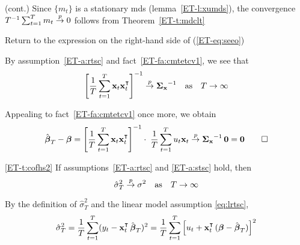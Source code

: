 \begin{frame}

    \vspace{2em}
    \Prf (cont.) Since
    $\{m_t\}$ is a stationary {\sc mds} (lemma~\ref{ET-l:xumds}), the convergence $T^{-1} \sum_{t=1}^T m_t
    \stackrel { p } {\to} 0$ follows from Theorem~\ref{ET-t:mdclt}
    
    Return to the expression on the right-hand side of
    (\ref{ET-eq:seeo})
    
    By assumption~\ref{ET-a:rtsc} and fact~\ref{ET-fa:cmtetcv1}, we see that
    \begin{equation}
        \label{eq:cttii}
        \left[ \frac{1}{T} \sum_{t=1}^T \boldx_t \boldx_t^\T \right]^{-1} \toprob \Sigmax^{-1}
        \quad \text{as} \quad
        T \to \infty
    \end{equation}
    
    Appealing to fact~\ref{ET-fa:cmtetcv1} once more, we obtain
    \begin{equation*}
        \hboldbeta_T - \boldbeta 
        = \left[ \frac{1}{T} \sum_{t=1}^T \boldx_t \boldx_t^\T \right]^{-1} 
            \cdot \; \frac{1}{T} \sum_{t=1}^T u_t \boldx_t 
            \toprob \Sigmax^{-1} \, \boldzero = \boldzero
        \qedhere
    \end{equation*}
    
\end{frame}

\begin{frame}

    \vspace{2em}
    \Thm
    \eqref{ET-t:cofhs2}
    If assumptions~\ref{ET-a:rtsc} and \ref{ET-a:stsc} hold, then 
    \begin{equation*}
        \hat \sigma^2_T \stackrel { p } {\to} \sigma^2
        \quad \text{as} \quad T \to \infty
    \end{equation*}
    
    
    \Prf 
    By the definition of $\hat \sigma_T^2$ and the linear model assumption
    \ref{eq:lrtsc},
    \begin{equation*}
        \label{eq:ndhs2}
        \hat \sigma_T^2 
        = \frac{1}{T} \sum_{t=1}^T (y_t - \boldx_t^\T \, \hboldbeta_T)^2
        = \frac{1}{T} \sum_{t=1}^T 
        \left[ u_t + \boldx_t^\T \, (\boldbeta - \hboldbeta_T) \right]^2
    \end{equation*}
    
\end{frame}

